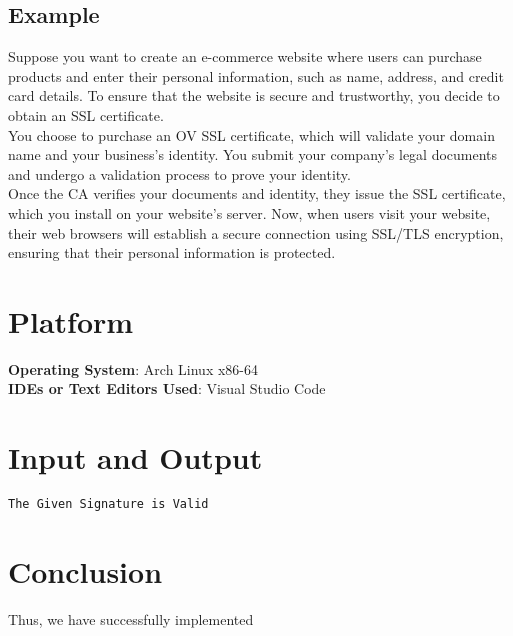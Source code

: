 \documentclass[11pt]{article}
\begin{document}
\subsection{Example}
Suppose you want to create an e-commerce website where users can purchase products and enter their personal information, such as name, address, and credit card details. To ensure that the website is secure and trustworthy, you decide to obtain an SSL certificate.\\

You choose to purchase an OV SSL certificate, which will validate your domain name and your business's identity. You submit your company's legal documents and undergo a validation process to prove your identity.\\

Once the CA verifies your documents and identity, they issue the SSL certificate, which you install on your website's server. Now, when users visit your website, their web browsers will establish a secure connection using SSL/TLS encryption, ensuring that their personal information is protected.

\section{Platform}
\textbf{\textbf{Operating System}}: Arch Linux x86-64 \\
\textbf{\textbf{IDEs or Text Editors Used}}: Visual Studio Code\\

\section{Input and Output}

\begin{verbatim}
The Given Signature is Valid
\end{verbatim}


% 

\section{Conclusion}
Thus, we have successfully implemented
\clearpage
\end{document}
